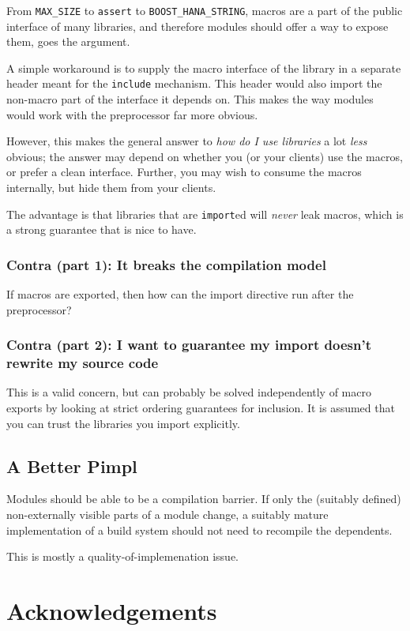 \documentclass[reqno]{article}
\begin{document}
From \texttt{MAX\_SIZE} to \texttt{assert} to \texttt{BOOST\_HANA\_STRING},
macros are a part of the public interface of many libraries, and therefore
modules should offer a way to expose them, goes the argument.

A simple workaround is to supply the macro interface of the library in a
separate header meant for the \texttt{include} mechanism. This header would
also import the non-macro part of the interface it depends on. This makes the
way modules would work with the preprocessor far more obvious.

However, this makes the general answer to \emph{how do I use libraries} a lot
\emph{less} obvious; the answer may depend on whether you (or your clients) use
the macros, or prefer a clean interface. Further, you may wish to consume the
macros internally, but hide them from your clients. 

The advantage is that libraries that are \texttt{import}ed will \emph{never}
leak macros, which is a strong guarantee that is nice to have.

\subsubsection{Contra (part 1): It breaks the compilation model}

If macros are exported, then how can the import directive run after the
preprocessor?


\subsubsection{Contra (part 2): I want to guarantee my import doesn't rewrite my source code}

This is a valid concern, but can probably be solved independently of macro
exports by looking at strict ordering guarantees for inclusion. It is assumed
that you can trust the libraries you import explicitly.


\subsection{A Better Pimpl}
Modules should be able to be a compilation barrier. If only the (suitably
defined) non-externally visible parts of a module change, a suitably mature
implementation of a build system should not need to recompile the dependents.

This is mostly a quality-of-implemenation issue.


\section{Acknowledgements}
\end{document}

